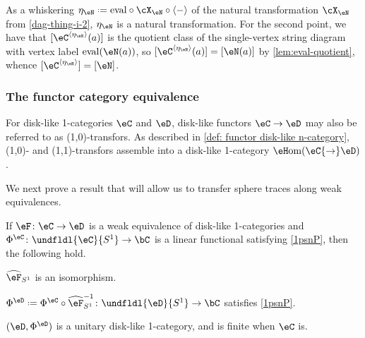 \documentclass[12pt,reqno]{amsart}
\newcommand{\eHom}{{\eH}\mathrm{om}}
\newcommand{\eval}{\mathrm{eval}}
\newcommand{\psn}{\Phi}
\newcommand{\C}{\eC}
\newcommand{\D}{\eD}
\DeclareRobustCommand{\coloneq}{\mathrel{\vcenter{\baselineskip0.5ex\lineskiplimit0pt\hbox{\scriptsize{\upshape.}}\hbox{\scriptsize{\upshape.}}}}=}
\begin{document}
\begin{pf} 
As a whiskering $\eta_\eN\coloneq\eval\circ\cX_\eN\circ\langle-\rangle$ of the natural transformation $\cX_\eN$ from \cref{dag-thing-i-2}, $\eta_\eN$ is a natural transformation. For the second point, we have that $[\eC^{\langle\eta_\eN\rangle}(a)]$ is the quotient class of the single-vertex string diagram with vertex label $\eval(\eN(a))$, so $[\eC^{\langle\eta_\eN\rangle}(a)]=[\eN(a)]$ by \cref{lem:eval-quotient}, whence $[\eC^{\langle\eta_\eN\rangle}]=[\eN]$.
\end{pf}


\subsubsection{The functor category equivalence}
For disk-like 1-categories $\C$ and $\D$, disk-like functors $\C\to\D$ may also be referred to as (1,0)-transfors. As described in \cref{def: functor disk-like n-category}, (1,0)- and (1,1)-transfors assemble into a disk-like 1-category $\eHom(\C{\to}\D)$. 

We next prove a result that will allow us to transfer sphere traces along weak equivalences.
\begin{proposition}
\label{tsf}
If $\eF \colon \eC \to \eD$ is a weak equivalence of disk-like 1-categories and $\psn^\C\colon \undfldl{\C}{S^1} \to \bC$ is a linear functional satisfying \ref{1psnP}, then the following hold.
\begin{lst} 
\item\label{tsfa} $\widehat\eF_{S^1}$ is an isomorphism.
\item\label{tsfb} $\psn^{\D} \coloneq \psn^{\C} \circ \widehat{\eF}_{S^1}^{-1} \colon \undfldl{\D}{S^1} \to \bC$ satisfies \ref{1psnP}.
\item\label{tsfc} $(\eD, \psn^{\eD})$ is a unitary disk-like 1-category, and is finite when $\eC$ is.
\end{lst}
\end{proposition}
\end{document}
